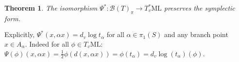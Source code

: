 \documentclass{amsart}
\newtheorem{theorem}{Theorem}
\newcommand{\ML}{\mathrm{ML}}
\newcommand{\Bb}{\mathcal{B}}
\begin{document}








\begin{theorem}\label{iso2}
The isomorphism $\Psi^*:\Bb(T)_\pi\to T_v^*\ML$ preserves the symplectic form.
\end{theorem}

Explicitly, $\Psi^*(x,\alpha x)=d_v\log t_\alpha$ for all $\alpha \in \pi_1(S)$ and any branch point $x\in A_\alpha$. Indeed for all $\phi\in T_v\ML$:  $\Psi(\phi)(x,\alpha x)=\frac{1}{2}\phi(d(x,\alpha x))=\phi(t_\alpha)=d_v\log(t_\alpha)(\phi)$.
\end{document}
